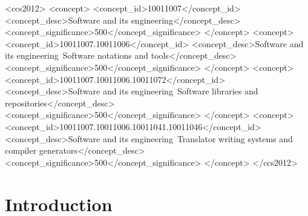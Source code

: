 \documentclass[acmsmall]{acmart}
\theoremstyle{definition}
\begin{document}

\begin{CCSXML}
<ccs2012>
   <concept>
       <concept_id>10011007</concept_id>
       <concept_desc>Software and its engineering</concept_desc>
       <concept_significance>500</concept_significance>
       </concept>
   <concept>
       <concept_id>10011007.10011006</concept_id>
       <concept_desc>Software and its engineering~Software notations and tools</concept_desc>
       <concept_significance>500</concept_significance>
       </concept>
   <concept>
       <concept_id>10011007.10011006.10011072</concept_id>
       <concept_desc>Software and its engineering~Software libraries and repositories</concept_desc>
       <concept_significance>500</concept_significance>
       </concept>
   <concept>
       <concept_id>10011007.10011006.10011041.10011046</concept_id>
       <concept_desc>Software and its engineering~Translator writing systems and compiler generators</concept_desc>
       <concept_significance>500</concept_significance>
       </concept>
 </ccs2012>
\end{CCSXML}


\maketitle

\section{Introduction}
\label{section:intro}

\end{document}
